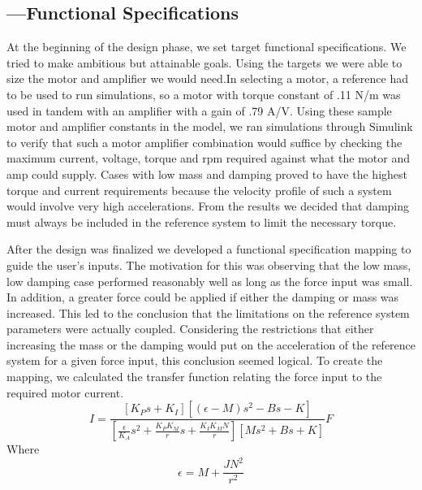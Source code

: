 \subsection*{---Functional Specifications}
At the beginning of the design phase, we set target functional specifications. We tried to make ambitious but attainable goals. Using the targets we were able to size the motor and amplifier we would need.In selecting a motor, a reference had to be used to run simulations, so a motor with torque constant of .11 N/m was used in tandem with an amplifier with a gain of .79 A/V. Using these sample motor and amplifier constants in the model, we ran simulations through Simulink to verify that such a motor amplifier combination would suffice by checking the maximum current, voltage, torque and rpm required against what the motor and amp could supply. Cases with low mass and damping proved to have the highest torque and current requirements because the velocity profile of such a system would involve very high accelerations. From the results we decided that damping must always be included in the reference system to limit the necessary torque.

After the design was finalized we developed a functional specification mapping to guide the user's inputs. The motivation for this was observing that the low mass, low damping case performed reasonably well as long as the force input was small. In addition, a greater force could be applied if either the damping or mass was increased. This led to the conclusion that the limitations on the reference system parameters were actually coupled. Considering the restrictions that either increasing the mass or the damping would put on the acceleration of the reference system for a given force input, this conclusion seemed logical. To create the mapping, we calculated the transfer function relating the force input to the required motor current.\begin{equation}
I = \frac{[K_{P}s+K_{I}][(\epsilon-M)s^{2}-Bs-K]}{[\frac{\epsilon}{K_{A}}s^{2}+\frac{K_{P}K_{M}}{r}s+\frac{K_{I}K_{M}N}{r}][Ms^{2}+Bs+K]}F
\end{equation}
Where 
\begin{equation}
\epsilon = M+\frac{JN^{2}}{r^{2}}
\end{equation}

